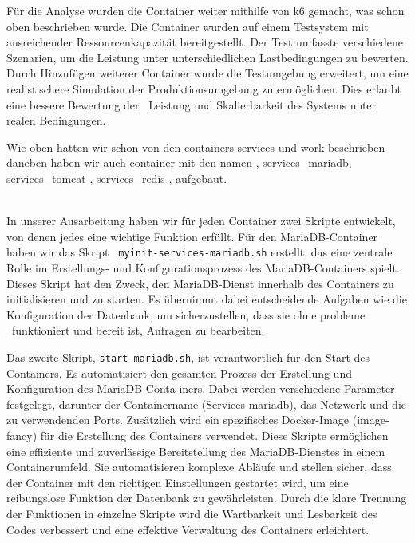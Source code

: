 {Für die Analyse wurden die Container weiter mithilfe von k6 gemacht, was schon oben beschrieben wurde. Die Container wurden auf einem Testsystem mit ausreichender Ressourcenkapazität
bereitgestellt. Der Test umfasste verschiedene Szenarien, um die Leistung unter unterschiedlichen Lastbedingungen zu bewerten.
Durch Hinzufügen weiterer Container wurde die Testumgebung erweitert, um eine realistischere Simulation der Produktionsumgebung zu ermöglichen. Dies erlaubt eine bessere Bewertung der
 Leistung und Skalierbarkeit des Systems unter realen Bedingungen.

Wie oben hatten wir schon von den containers services und work beschrieben daneben haben wir auch container mit den namen , services_mariadb, services_tomcat , services_redis , aufgebaut.

\\

In unserer Ausarbeitung haben wir für jeden Container zwei Skripte entwickelt, von denen jedes eine wichtige Funktion erfüllt. Für den MariaDB-Container haben wir das Skript \texttt{
myinit-services-mariadb.sh} erstellt, das eine zentrale Rolle im Erstellungs- und Konfigurationsprozess des MariaDB-Containers spielt. Dieses Skript hat den Zweck, den MariaDB-Dienst
innerhalb des Containers zu initialisieren und zu starten. Es übernimmt dabei entscheidende Aufgaben wie die Konfiguration der Datenbank, um sicherzustellen, dass sie ohne probleme  funktioniert und bereit ist, Anfragen zu bearbeiten.

Das zweite Skript, \texttt{start-mariadb.sh}, ist verantwortlich für den Start des Containers. Es automatisiert den gesamten Prozess der Erstellung und Konfiguration des MariaDB-Conta
iners. Dabei werden verschiedene Parameter festgelegt, darunter der Containername (Services-mariadb), das Netzwerk und die zu verwendenden Ports. Zusätzlich wird ein spezifisches Docker-Image (image-fancy) für die Erstellung des Containers verwendet.
Diese Skripte ermöglichen eine effiziente und zuverlässige Bereitstellung des MariaDB-Dienstes in einem Containerumfeld. Sie automatisieren komplexe Abläufe und stellen sicher, dass der Container mit den richtigen Einstellungen gestartet wird, um eine reibungslose Funktion der Datenbank zu gewährleisten. Durch die klare Trennung der Funktionen in einzelne Skripte
wird die Wartbarkeit und Lesbarkeit des Codes verbessert und eine effektive Verwaltung des Containers erleichtert.

\\

}
